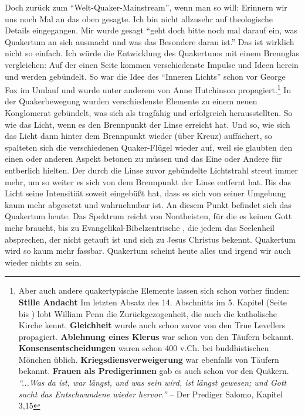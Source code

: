 Doch zurück zum "`Welt-Quaker-Mainstream"', wenn man so
will: Erinnern wir uns noch Mal
an das oben gesagte. Ich bin nicht allzusehr auf theologische Details
eingegangen. Mir wurde gesagt "`geht doch bitte noch mal darauf ein, was
Quakertum an sich ausmacht und was das Besondere daran ist."' Das ist wirklich
nicht so einfach. Ich würde die Entwicklung des Quakertums mit einem
Brennglas
vergleichen: Auf der einen Seite kommen verschiedenste Impulse und Ideen herein
und werden gebündelt. So war die Idee des "`Inneren
Lichts"' schon vor
George Fox im Umlauf und wurde unter anderem von
Anne Hutchinson propagiert.\footnote{Aber auch
andere quakertypische Elemente lassen sich schon vorher finden:
\textbf{Stille Andacht} Im letzten Absatz des 14. Abschnitts im 5. Kapitel
(Seite~\pageref{kap5_ab14} bis \pageref{ref:05_13_zurueckgezogenheit_ende}) lobt
William Penn die Zurückgezogenheit, die auch die katholische Kirche kennt.
\textbf{Gleichheit} wurde auch schon zuvor von den True Levellers propagiert.
\textbf{Ablehnung eines Klerus} war schon von den Täufern bekannt.
\textbf{Konsensentscheidungen} waren schon 400 v.Ch. bei buddhistischen Mönchen
üblich.
\textbf{Kriegsdiensverweigerung} war ebenfalls von Täufern bekannt.
\textbf{Frauen als Predigerinnen} gab es auch schon vor den Quäkern.
\textit{"`...Was da ist, war längst, und was sein wird, ist längst gewesen; und
Gott sucht das Entschwundene wieder hervor."'} -- Der Prediger Salomo, Kapitel
3,15
} In der
Quakerbewegung wurden verschiedenste Elemente zu einem neuen Konglomerat
gebündelt, was sich als tragfähig und erfolgreich herausstellten.
So wie das Licht, wenn
es den Brennpunkt der Linse erreicht hat. Und so, wie sich das Licht dann hinter
dem Brennpunkt wieder (über Kreuz) auffächert, so spalteten sich die
verschiedenen Quaker-Flügel wieder auf, weil sie glaubten
den einen oder anderen Aspekt betonen zu müssen und das Eine oder Andere für
entberlich hielten. Der durch die Linse zuvor gebündelte
Lichtstrahl streut immer mehr, um so weiter es sich von dem
Brennpunkt der Linse entfernt hat. Bis das Licht seine Intensitiät soweit
eingebüßt hat, dass es sich von seiner Umgebung kaum mehr abgesetzt und wahrnehmbar
ist. An diesem
Punkt befindet sich das Quakertum heute. Das Spektrum reicht von Nontheisten,
für die
es keinen Gott mehr braucht, bis zu
Evangelikal-Bibelzentrische
, die jedem das
Seelenheil absprechen, der nicht getauft ist und sich zu
Jesus Christus
bekennt. Quakertum wird so kaum mehr fassbar. Quakertum scheint heute alles und
irgend wir auch wieder nichts zu sein.

